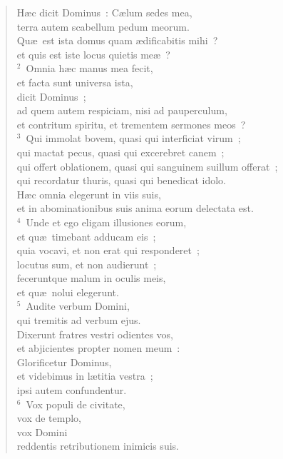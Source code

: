 \begin{flushleft}\begin{verse}\vspace{-19pt}\hspace{6pt}H\ae c dicit Dominus~: C\ae lum sedes mea,\\\hspace{6pt} terra autem scabellum pedum meorum.\\ Qu\ae\ est ista domus quam \ae dificabitis mihi~?\\ et quis est iste locus quietis me\ae~?\\
${}^{2}$~Omnia h\ae c manus mea fecit,\\ et facta sunt universa ista,\\ dicit Dominus~;\\ ad quem autem respiciam, nisi ad pauperculum,\\ et contritum spiritu, et trementem sermones meos~?\\
${}^{3}$~Qui immolat bovem, quasi qui interficiat virum~;\\ qui mactat pecus, quasi qui excerebret canem~;\\ qui offert oblationem, quasi qui sanguinem suillum offerat~;\\ qui recordatur thuris, quasi qui benedicat idolo.\\ H\ae c omnia elegerunt in viis suis,\\ et in abominationibus suis anima eorum delectata est.\\
${}^{4}$~Unde et ego eligam illusiones eorum,\\ et qu\ae\ timebant adducam eis~;\\ quia vocavi, et non erat qui responderet~;\\ locutus sum, et non audierunt~;\\ feceruntque malum in oculis meis,\\ et qu\ae\ nolui elegerunt.\\
${}^{5}$~Audite verbum Domini,\\ qui tremitis ad verbum ejus.\\ Dixerunt fratres vestri odientes vos,\\ et abjicientes propter nomen meum~:\\ Glorificetur Dominus,\\ et videbimus in l\ae titia vestra~;\\ ipsi autem confundentur.\\
${}^{6}$~Vox populi de civitate,\\ vox de templo,\\ vox Domini\\ reddentis retributionem inimicis suis.\\

\end{verse}
\end{flushleft}

